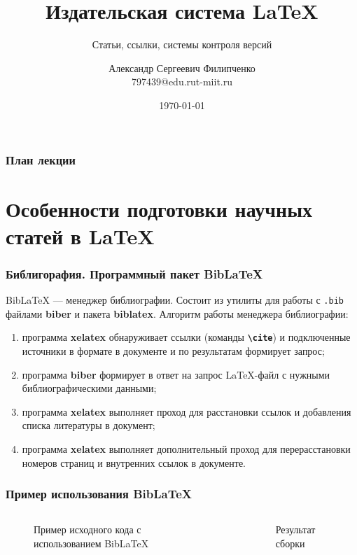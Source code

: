 \documentclass[aspectratio=169]{beamer}
\title[Заголовок]{Издательская система \LaTeX{}}
\subtitle{Статьи, ссылки, системы контроля версий}
\author[Имя автора]{Александр Сергеевич Филипченко \\ \smallskip \scriptsize 797439@edu.rut-miit.ru\\}
\institute{кафедра <<Вычислительные системы, сети и информационная безопасность>>}
\date{\today}
\begin{document}

\frame[plain]{\titlepage}	%

\begin{frame}
\frametitle{План лекции}
\tableofcontents
\end{frame}

\section{Особенности подготовки научных статей в \LaTeX{}}

\begin{frame}
\frametitle{Библигорафия. Программный пакет BibLaTeX}
BibLaTeX --- менеджер библиографии.
Состоит из утилиты для работы с \texttt{.bib} файлами \textbf{biber} и пакета \textbf{biblatex}.
Алгоритм работы менеджера библиографии:
\begin{enumerate} 
\item программа \textbf{xelatex} обнаруживает ссылки (команды \texttt{\textbf{\textbackslash cite}}) и подключенные источники в формате в документе и по результатам формирует запрос;
\item программа \textbf{biber} формирует в ответ на запрос LaTeX-файл с нужными библиографическими данными;
\item программа \textbf{xelatex} выполняет проход для расстановки ссылок и добавления списка литературы в документ;
\item программа \textbf{xelatex} выполняет дополнительный проход для перерасстановки номеров страниц и внутренних ссылок в документе.
\end{enumerate} 
\end{frame}

\begin{frame}
\frametitle{Пример использования BibLaTeX}
\medskip
\begin{columns}
\begin{figure}
\centering
{}
\caption{Пример исходного кода с использованием BibLaTeX}
\end{figure}
\begin{figure}
\centering
{}
\caption{Результат сборки}
\end{figure}
\end{columns}
\end{frame}
\end{document}
